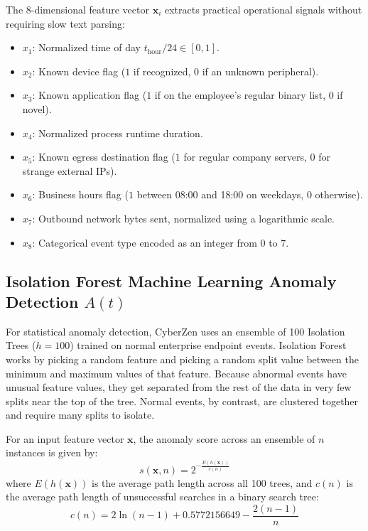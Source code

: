 \documentclass[conference]{IEEEtran}
\begin{document}
The 8-dimensional feature vector $\mathbf{x}_i$ extracts practical operational signals without requiring slow text parsing:
\begin{itemize}
    \item $x_1$: Normalized time of day $t_{\text{hour}} / 24 \in [0, 1]$.
    \item $x_2$: Known device flag ($1$ if recognized, $0$ if an unknown peripheral).
    \item $x_3$: Known application flag ($1$ if on the employee's regular binary list, $0$ if novel).
    \item $x_4$: Normalized process runtime duration.
    \item $x_5$: Known egress destination flag ($1$ for regular company servers, $0$ for strange external IPs).
    \item $x_6$: Business hours flag ($1$ between 08:00 and 18:00 on weekdays, $0$ otherwise).
    \item $x_7$: Outbound network bytes sent, normalized using a logarithmic scale.
    \item $x_8$: Categorical event type encoded as an integer from $0$ to $7$.
\end{itemize}

\subsection{Isolation Forest Machine Learning Anomaly Detection $A(t)$}
For statistical anomaly detection, CyberZen uses an ensemble of 100 Isolation Trees ($h=100$) trained on normal enterprise endpoint events. Isolation Forest works by picking a random feature and picking a random split value between the minimum and maximum values of that feature. Because abnormal events have unusual feature values, they get separated from the rest of the data in very few splits near the top of the tree. Normal events, by contrast, are clustered together and require many splits to isolate.

For an input feature vector $\mathbf{x}$, the anomaly score across an ensemble of $n$ instances is given by:
\begin{equation}
s(\mathbf{x}, n) = 2^{-\frac{E(h(\mathbf{x}))}{c(n)}}
\end{equation}
where $E(h(\mathbf{x}))$ is the average path length across all 100 trees, and $c(n)$ is the average path length of unsuccessful searches in a binary search tree:
\begin{equation}
c(n) = 2 \ln(n-1) + 0.5772156649 - \frac{2(n-1)}{n}
\end{equation}
\end{document}
